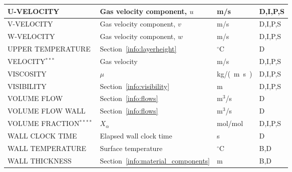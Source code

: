 \documentclass[11pt]{book}
\begin{document}
\begin{longtable}{@{\extracolsep{\fill}}|l|l|l|l|}
{\ct U-VELOCITY}                                & Gas velocity component, $u$                   & m/s            & D,I,P,S      \\ \hline
{\ct V-VELOCITY}                                & Gas velocity component, $v$                   & m/s            & D,I,P,S      \\ \hline
{\ct W-VELOCITY}                                & Gas velocity component, $w$                   & m/s            & D,I,P,S      \\ \hline
{\ct UPPER TEMPERATURE}                         & Section~\ref{info:layerheight}                & $^\circ$C      & D            \\ \hline
{\ct VELOCITY}$^{***}$                          & Gas velocity                                  & m/s            & D,I,P,S      \\ \hline
{\ct VISCOSITY}                                 & $\mu$                                         & \si{kg/(m.s)}  & D,I,P,S      \\ \hline
{\ct VISIBILITY}                                & Section~\ref{info:visibility}                 & m              & D,I,P,S      \\ \hline
{\ct VOLUME FLOW}                               & Section~\ref{info:flows}                      & m$^3$/s        & D            \\ \hline
{\ct VOLUME FLOW WALL}                          & Section~\ref{info:flows}                      & m$^3$/s        & D            \\ \hline
{\ct VOLUME FRACTION}$^{****}$                  & $X_\alpha$                                    & mol/mol        & D,I,P,S      \\ \hline
{\ct WALL CLOCK TIME}                           & Elapsed wall clock time                       & s              & D            \\ \hline
{\ct WALL TEMPERATURE}                          & Surface temperature                           & $^\circ$C      & B,D          \\ \hline
{\ct WALL THICKNESS}                            & Section~\ref{info:material_components}        & m              & B,D          \\ \hline
\end{longtable}
\end{document}
